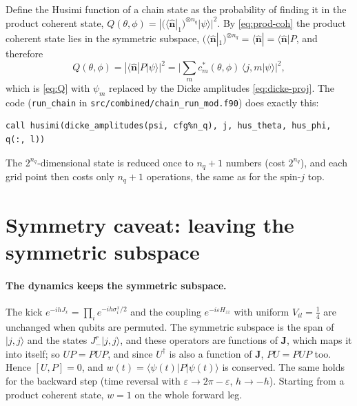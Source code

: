 \documentclass[11pt,a4paper]{article}
\newcommand{\vJ}{\bm{J}}
\newcommand{\vn}{\hat{\bm n}}
\begin{document}
Define the Husimi function of a chain state as the probability of finding it in the product coherent state,
$Q(\theta,\phi) = |(\langle\vn|_1)^{\otimes n_q}|\psi\rangle|^2$. By \eqref{eq:prod-coh} the product coherent state
lies in the symmetric subspace, $(\langle\vn|_1)^{\otimes n_q} = \langle\vn| = \langle\vn|P$, and therefore
\begin{equation}\label{eq:Q-chain}
  Q(\theta,\phi) = |\langle\vn|P|\psi\rangle|^2 = \Big|\sum_m c_m^*(\theta,\phi)\,\langle j,m|\psi\rangle\Big|^2 ,
\end{equation}
which is \eqref{eq:Q} with $\psi_m$ replaced by the Dicke amplitudes \eqref{eq:dicke-proj}. The code (\texttt{run\_chain}
in \texttt{src/combined/chain\_run\_mod.f90}) does exactly this:
\begin{lstlisting}
call husimi(dicke_amplitudes(psi, cfg%n_q), j, hus_theta, hus_phi, q(:, l))
\end{lstlisting}
The $2^{n_q}$-dimensional state is reduced once to $n_q+1$ numbers (cost $2^{n_q}$), and each grid point then costs only
$n_q+1$ operations, the same as for the spin-$j$ top.

\section{Symmetry caveat: leaving the symmetric subspace}\label{sec:caveat}

\paragraph{The dynamics keeps the symmetric subspace.} The kick $e^{-ihJ_x} = \prod_ie^{-ih\sigma^x_i/2}$ and the
coupling $e^{-i\varepsilon H_{zz}}$ with uniform $V_{il} = \frac14$ are unchanged when qubits are permuted. The
symmetric subspace is the span of $|j,j\rangle$ and the states $J_-^r|j,j\rangle$, and these operators are functions of
$\vJ$, which maps it into itself; so $UP = PUP$, and since $U^\dagger$ is also a function of $\vJ$, $PU = PUP$ too.
Hence $[U,P] = 0$, and $w(t) = \langle\psi(t)|P|\psi(t)\rangle$ is conserved. The same holds for the backward step (time
reversal with $\varepsilon\to2\pi-\varepsilon$, $h\to-h$). Starting from a product coherent state, $w = 1$ on the whole forward leg.
\end{document}
